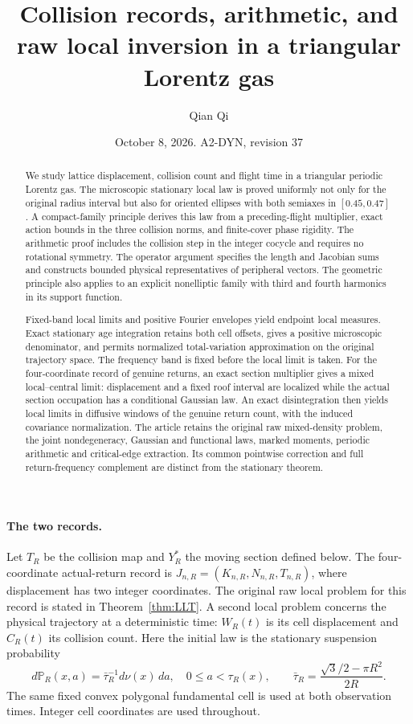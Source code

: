 \documentclass[11pt,reqno]{amsart}
\title[Collision records and raw local inversion]{Collision records, arithmetic, and raw local inversion in a triangular Lorentz gas}
\author{Qian Qi}
\date{October 8, 2026. A2-DYN, revision 37}
\numberwithin{equation}{section}
\theoremstyle{definition}\newtheorem{definition}[theorem]{Definition}
\theoremstyle{remark}\newtheorem{remark}[theorem]{Remark}
\begin{document}
\raggedbottom
\begin{abstract}
We study lattice displacement, collision count and flight time in a
triangular periodic Lorentz gas. The microscopic stationary local law
is proved uniformly not only for the original radius interval but also
for oriented ellipses with both semiaxes in $[0.45,0.47]$. A compact-family
principle derives this law from a preceding-flight multiplier, exact
action bounds in the three collision norms, and finite-cover phase
rigidity. The arithmetic proof includes the collision step in the
integer cocycle and requires no rotational symmetry. The operator
argument specifies the length and Jacobian sums and constructs bounded
physical representatives of peripheral vectors. The geometric principle
also applies to an explicit nonelliptic family with third and fourth
harmonics in its support function.

Fixed-band local limits and positive Fourier envelopes yield endpoint
local measures. Exact stationary age integration retains both cell
offsets, gives a positive microscopic denominator, and permits
normalized total-variation approximation on the original trajectory
space. The frequency band is fixed before the local limit is taken.
For the four-coordinate record of genuine returns, an exact section
multiplier gives a mixed local--central limit: displacement and a
fixed roof interval are localized while the actual section occupation
has a conditional Gaussian law. An exact disintegration then yields
local limits in diffusive windows of the genuine return count, with
the induced covariance normalization. The article retains the original
raw mixed-density problem, the joint nondegeneracy,
Gaussian and functional laws, marked moments, periodic arithmetic and
critical-edge extraction. Its common pointwise correction and full
return-frequency complement are distinct from the stationary theorem.
\end{abstract}
\maketitle
\enlargethispage{3pt}

\paragraph{The two records.}
Let $T_R$ be the collision map and $Y_R^*$ the moving section defined
below. The four-coordinate actual-return record is
$J_{n,R}=(K_{n,R},N_{n,R},T_{n,R})$, where displacement has two integer
coordinates. The original raw local problem for this record is stated
in Theorem~\ref{thm:LLT}. A second local problem concerns the physical
trajectory at a deterministic time: $W_R(t)$ is its cell displacement
and $C_R(t)$ its collision count. Here the initial law is the stationary
suspension probability
\[
 d\mathbb P_R(x,a)=\bar\tau_R^{-1}d\nu(x)\,da,
 \quad 0\le a<\tau_R(x),\qquad
 \bar\tau_R=\frac{\sqrt3/2-\pi R^2}{2R}.
\]
The same fixed convex polygonal fundamental cell is used at both
observation times. Integer cell coordinates are used throughout.
\end{document}
